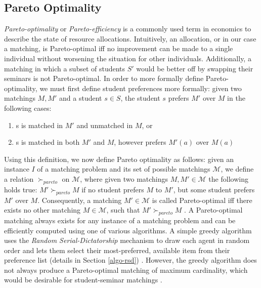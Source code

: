 \subsection{Pareto Optimality}
\emph{Pareto-optimality} or \emph{Pareto-efficiency} is a commonly used term in economics to describe the state of resource allocations. Intuitively, an allocation, or in our case a matching, is Pareto-optimal iff no improvement can be made to a single individual without worsening the situation for other individuals. Additionally, a matching in which a subset of students $S'$ would be better off by swapping their seminars is not Pareto-optimal.
In order to more formally define Pareto-optimality, we must first define student preferences more formally: 
given two matchings $M, M'$ and a student $s \in S$, the student $s$ prefers $M'$ over $M$ in the following cases:
\begin{enumerate}
    \item s is matched in $M'$ and unmatched in $M$, or
    \item s is matched in both $M'$ and $M$, however prefers $M'(a)$ over $M(a)$
\end{enumerate}
Using this definition, we now define Pareto optimality as follows: given an instance $I$ of a matching problem and its set of possible matchings $\mathcal{M}$, we define a relation $\succ_{pareto}$ on $\mathcal{M}$, where given two matchings $M, M' \in \mathcal{M}$ the following holds true: $M' \succ_{pareto} M$ if no student prefers $M$ to $M'$, but some student prefers $M'$ over $M$. Consequently, a matching $M' \in \mathcal{M}$ is called Pareto-optimal iff there exists no other matching $M \in \mathcal{M}$, such that $M' \succ_{pareto} M$ \cite{algorithmics}. A Pareto-optimal matching always exists for any instance of a matching problem and can be efficiently computed using one of various algorithms. A simple greedy algorithm uses the \emph{Random Serial-Dictatorship} mechanism to draw each agent in random order and lets them select their most-preferred, available item from their preference list (details in Section \ref{algo-rsd}) \cite{RothTwoSided, SerialDictatorship}. However, the greedy algorithm does not always produce a Pareto-optimal matching of maximum cardinality, which would be desirable for student-seminar matchings \cite{Abraham:Pacha}.

